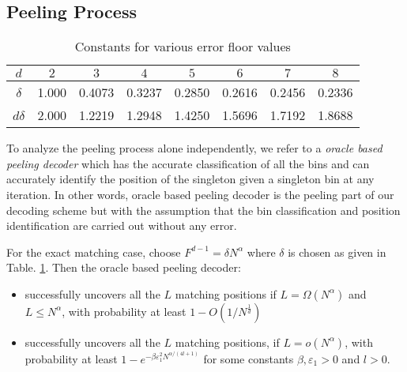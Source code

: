 \subsection{\bf Peeling Process}
\begin{table}[ht]
	\centering
	\begin{tabular}{| c | c | c | c | c | c | c | c | }
		\hline
		$d$ & $2$& $3$ & $4$ & $5$ & $6$ & $7$ & $8$ \\ \hline
		$\delta$ & 1.000 & 0.4073 & 0.3237 & 0.2850 & 0.2616 & 0.2456 & 0.2336 \\ \hline
		$d\delta$ & 2.000 & 1.2219 & 1.2948 & 1.4250 & 1.5696 & 1.7192 & 1.8688 \\ \hline
	\end{tabular}
	\vspace{1ex}
	\caption{Constants for various error floor values}
	\label{Table:EtaValues}
\end{table}
To analyze the peeling process alone independently, we refer to a {\it oracle based peeling decoder} which has the accurate classification of all the bins and can accurately  identify the position of the singleton given a singleton bin at any iteration. In other words, oracle based peeling decoder is the peeling part of our decoding scheme but with the assumption that the bin classification and position identification are carried out without any error.
\begin{lemma}
For the exact matching case, choose $F^{d-1}=\delta N^\alpha$ where $\delta$ is chosen as given in Table. \ref{Table:EtaValues}. Then the oracle based peeling decoder:
\begin{itemize}
\item successfully uncovers all the $L$ matching positions if $L=\Omega(N^{\alpha})$ and $L\leq N^{\alpha}$, with probability at least $1-O(1/N^{\frac{1}{d}})$
\item successfully uncovers all the $L$ matching positions, if $L=o(N^{\alpha})$, with probability at least $1-e^{-\beta \varepsilon_1^2N^{\alpha/(4l+1)}}$ for some constants $\beta,\varepsilon_1>0$ and $l>0.$
\end{itemize}\label{Lem:peeling_exact}
\end{lemma}
